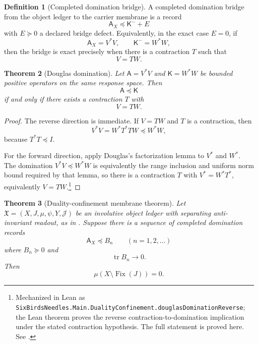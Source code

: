 \documentclass[11pt]{article}
\DeclareMathOperator{\tr}{tr}
\newcommand{\K}{\mathsf K}
\newcommand{\Fix}{\operatorname{Fix}}
\newcommand{\preceqq}{\preceq}
\newtheorem{theorem}{Theorem}[section]
\theoremstyle{definition}
\newtheorem{definition}[theorem]{Definition}
\begin{document}
\begin{definition}[Completed domination bridge]\label{def:main:domination-bridge}
A completed domination bridge from the object ledger to the carrier
membrane is a record
\[
  \mathsf A_X\preceqq \K^-+E
\]
with \(E\succeq 0\) a declared bridge defect.  Equivalently, in the
exact case \(E=0\), if
\[
  \mathsf A_X=V^*V,\qquad \K^-=W^*W,
\]
then the bridge is exact precisely when there is a contraction \(T\)
such that
\[
  V=TW.
\]
\end{definition}

\begin{theorem}[Douglas domination]\label{thm:main:douglas-domination}
Let \(\mathsf A=V^*V\) and \(\mathsf K=W^*W\) be bounded positive
operators on the same response space.  Then
\[
  \mathsf A\preceqq\mathsf K
\]
if and only if there exists a contraction \(T\) with
\[
  V=TW.
\]
\end{theorem}

\begin{proof}
The reverse direction is immediate.  If \(V=TW\) and \(T\) is a
contraction, then
\[
  V^*V=W^*T^*TW\preceqq W^*W,
\]
because \(T^*T\preceqq I\).

For the forward direction, apply Douglas's factorization lemma to
\(V^*\) and \(W^*\).  The domination
\(V^*V\preceqq W^*W\) is equivalently the range inclusion and uniform
norm bound required by that lemma, so there is a contraction \(T\) with
\(V^*=W^*T^*\), equivalently \(V=TW\).\footnote{Mechanized in Lean as
\texttt{SixBirdsNeedles.Main.DualityConfinement.douglasDominationReverse};
the Lean theorem proves the reverse contraction-to-domination
implication under the stated contraction hypothesis.  The full
statement is proved here.  See .}
\end{proof}

\begin{theorem}[Duality-confinement membrane theorem]\label{thm:main:duality-confinement-master}
Let \(\mathfrak X=(X,J,\mu,\psi,Y,\mathcal J)\) be an involutive object
ledger with separating anti-invariant readout, as in
.  Suppose
there is a sequence of completed domination records
\[
  \mathsf A_X\preceqq B_n \qquad (n=1,2,\ldots)
\]
where \(B_n\succeq 0\) and
\[
  \tr B_n\to 0.
\]
Then
\[
  \mu(X\setminus\Fix(J))=0.
\]
\end{theorem}
\end{document}
